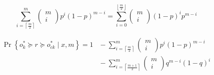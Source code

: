 \xiaosi


\begin{equation}
     \sum_{i=\left\lceil\frac{m}{2}\right\rceil}^{m}\left(\begin{array}{c}
     m \\
     i
     \end{array}\right) p^{i}(1-p)^{m-i}=\sum_{i=0}^{\left\lfloor\frac{m}{2}\right\rfloor}\left(\begin{array}{c}
     m \\
     i
     \end{array}\right)(1-p)^{i} p^{m-i}
\end{equation}


\begin{equation}
    \begin{aligned}
        \operatorname{Pr}\left\{o_{k}^{*} \!\succeq \!r\! \succeq \!o_{c k}^{*} \mid x, m\right\}\!=\!1 & \!-\!\sum_{i=\left\lceil\frac{m}{2}\right\rceil}^{m}\!\left(\!\begin{array}{c}
        m \\
        i
        \end{array}\right) p^{i}(1\!-\!p)^{m\!-\!i} \\
        & \!-\!\sum_{i=\left\lceil\frac{m+1}{2}\right\rceil}^{m}\!\left(\!\begin{array}{c}
        m \\
        i
        \end{array}\right) q^{m\!-\!i}(1\!-\!q)^{i}
    \end{aligned}
\end{equation}